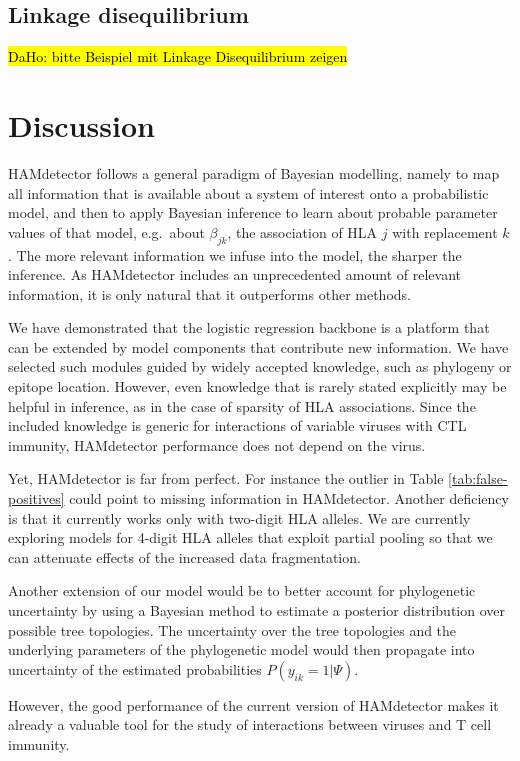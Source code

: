 \documentclass{bioinfo}
\begin{document}
 \subsection{Linkage disequilibrium}
 
 \hl{DaHo: bitte Beispiel mit Linkage Disequilibrium zeigen}

\section{Discussion}

HAMdetector follows a general paradigm of Bayesian modelling, namely to map all information that is available about a system of interest onto a probabilistic model, and then to apply Bayesian inference to learn about probable parameter values of that model, e.g.\ about $\beta_{jk}$, the association of HLA $j$ with replacement $k$. The more relevant information we infuse into the model, the sharper the inference. As HAMdetector includes an unprecedented amount of relevant information, it is only natural that it outperforms other methods.

We have demonstrated that the logistic regression backbone is a platform that can be extended by model components that contribute new information. We have selected such modules guided by widely accepted knowledge, such as phylogeny or epitope location. However, even knowledge that is rarely stated explicitly may be helpful in inference, as in the case of sparsity of HLA associations. Since the included knowledge is generic for interactions of variable viruses with CTL immunity, HAMdetector performance does not depend on the virus.

Yet, HAMdetector is far from perfect. For instance the outlier in Table \ref{tab:false-positives} could point to missing information in HAMdetector. Another deficiency is that it currently works only with two-digit HLA alleles. We are currently exploring models for 4-digit HLA alleles that exploit partial pooling so that we can attenuate effects of the increased data fragmentation.

Another extension of our model would be to better account for phylogenetic uncertainty by using a Bayesian method to estimate a posterior distribution over possible tree topologies. The uncertainty over the tree topologies and the underlying parameters of the phylogenetic model would then propagate into uncertainty of the estimated probabilities \(P(y_{ik}=1|\Psi)\).

However, the good performance of the current version of HAMdetector makes it already a valuable tool for the study of interactions between viruses and T cell immunity.
\end{document}
